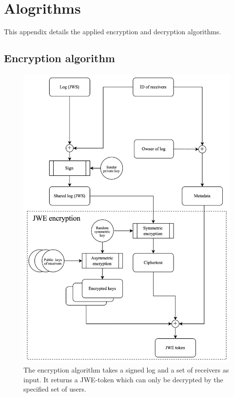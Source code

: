 \documentclass[../main.tex]{subfiles}
\begin{document}
\chapter{Alogrithms}

This appendix details the applied encryption and decryption algorithms.

\section{Encryption algorithm}
\label{app:encryption}
\begin{figure}[h]
    \includegraphics[scale=0.13]{../img/05/encrypt_logs.jpg}
    \centering
    \caption{The encryption algorithm takes a signed log and a set of receivers as input. It returns a JWE-token which can only be decrypted by the specified set of users.}
    \label{app:encryption_algo}
\end{figure}
\newpage
\end{document}
